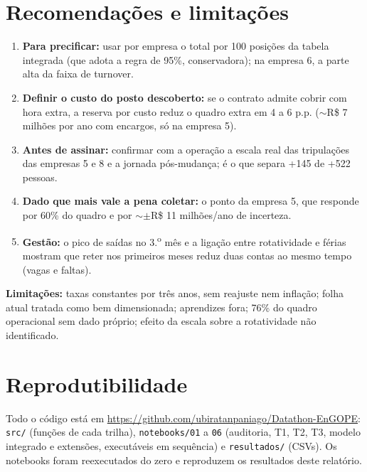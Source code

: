 \documentclass[11pt,a4paper]{article}
\begin{document}
\section{Recomendações e limitações}
\begin{enumerate}
\item \textbf{Para precificar:} usar por empresa o total por 100 posições da tabela integrada (que adota a regra de 95\%, conservadora); na empresa 6, a parte alta da faixa de turnover.
\item \textbf{Definir o custo do posto descoberto:} se o contrato admite cobrir com hora extra, a reserva por custo reduz o quadro extra em 4 a 6 p.p. ($\sim$R\$ 7 milhões por ano com encargos, só na empresa 5).
\item \textbf{Antes de assinar:} confirmar com a operação a escala real das tripulações das empresas 5 e 8 e a jornada pós-mudança; é o que separa +145 de +522 pessoas.
\item \textbf{Dado que mais vale a pena coletar:} o ponto da empresa 5, que responde por 60\% do quadro e por $\sim\pm$R\$ 11 milhões/ano de incerteza.
\item \textbf{Gestão:} o pico de saídas no 3.\textsuperscript{o} mês e a ligação entre rotatividade e férias mostram que reter nos primeiros meses reduz duas contas ao mesmo tempo (vagas e faltas).
\end{enumerate}
\textbf{Limitações:} taxas constantes por três anos, sem reajuste nem inflação; folha atual tratada como bem dimensionada; aprendizes fora; 76\% do quadro operacional sem dado próprio; efeito da escala sobre a rotatividade não identificado.

\section*{Reprodutibilidade}
Todo o código está em \url{https://github.com/ubiratanpaniago/Datathon-EnGOPE}: \texttt{src/} (funções de cada trilha), \texttt{notebooks/01} a \texttt{06} (auditoria, T1, T2, T3, modelo integrado e extensões, executáveis em sequência) e \texttt{resultados/} (CSVs). Os notebooks foram reexecutados do zero e reproduzem os resultados deste relatório.
\end{document}
